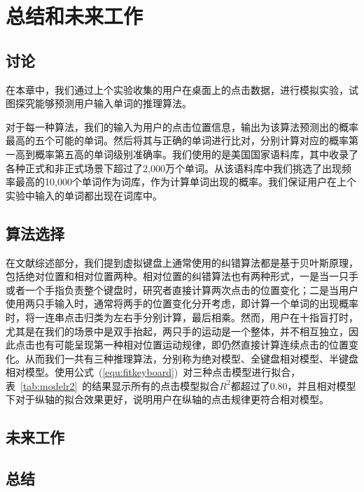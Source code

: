 \chapter{总结和未来工作}
\label{cha:conclusion}
\section{讨论}
在本章中，我们通过上个实验收集的用户在桌面上的点击数据，进行模拟实验，试图探究能够预测用户输入单词的推理算法。

对于每一种算法，我们的输入为用户的点击位置信息，输出为该算法预测出的概率最高的五个可能的单词。然后将其与正确的单词进行比对，分别计算对应的概率第一高到概率第五高的单词级别准确率。我们使用的是美国国家语料库，其中收录了各种正式和非正式场景下超过了2,000万个单词。从该语料库中我们挑选了出现频率最高的10,000个单词作为词库，作为计算单词出现的概率。我们保证用户在上个实验中输入的单词都出现在词库中。

\section{算法选择}
在文献综述部分，我们提到虚拟键盘上通常使用的纠错算法都是基于贝叶斯原理，包括绝对位置和相对位置两种。相对位置的纠错算法也有两种形式，一是当一只手或者一个手指负责整个键盘时，研究者直接计算两次点击的位置变化；二是当用户使用两只手输入时，通常将两手的位置变化分开考虑，即计算一个单词的出现概率时，将一连串点击归类为左右手分别计算，最后相乘。然而，用户在十指盲打时，尤其是在我们的场景中是双手抬起，两只手的运动是一个整体，并不相互独立，因此点击也有可能呈现第一种相对位置运动规律，即仍然直接计算连续点击的位置变化。从而我们一共有三种推理算法，分别称为绝对模型、全键盘相对模型、半键盘相对模型。使用公式~(\ref{equ:fitkeyboard})~对三种点击模型进行拟合，表~\ref{tab:modelr2}~的结果显示所有的点击模型拟合$R^2$都超过了0.80，并且相对模型下对于纵轴的拟合效果更好，说明用户在纵轴的点击规律更符合相对模型。

\section{未来工作} %
\section{总结}
